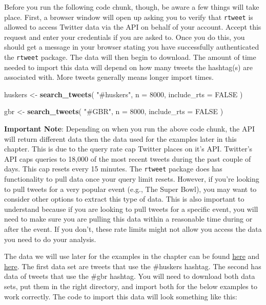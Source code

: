 \documentclass[
]{book}
\newenvironment{Shaded}{\begin{snugshade}}{\end{snugshade}}
\newcommand{\DataTypeTok}[1]{\textcolor[rgb]{0.13,0.29,0.53}{#1}}
\newcommand{\DecValTok}[1]{\textcolor[rgb]{0.00,0.00,0.81}{#1}}
\newcommand{\KeywordTok}[1]{\textcolor[rgb]{0.13,0.29,0.53}{\textbf{#1}}}
\newcommand{\NormalTok}[1]{#1}
\newcommand{\OtherTok}[1]{\textcolor[rgb]{0.56,0.35,0.01}{#1}}
\newcommand{\StringTok}[1]{\textcolor[rgb]{0.31,0.60,0.02}{#1}}
\begin{document}
Before you run the following code chunk, though, be aware a few things will take place. First, a browser window will open up asking you to verify that \texttt{rtweet} is allowed to access Twitter data via the API on behalf of your account. Accept this request and enter your credentials if you are asked to. Once you do this, you should get a message in your browser stating you have successfully authenticated the \texttt{rtweet} package. The data will then begin to download. The amount of time needed to import this data will depend on how many tweets the hashtag(s) are associated with. More tweets generally means longer import times.

\begin{Shaded}
\begin{Highlighting}[]
\NormalTok{huskers <-}\StringTok{ }\KeywordTok{search_tweets}\NormalTok{(}
  \StringTok{"#huskers"}\NormalTok{, }\DataTypeTok{n =} \DecValTok{8000}\NormalTok{, }\DataTypeTok{include_rts =} \OtherTok{FALSE}
\NormalTok{)}

\NormalTok{gbr <-}\StringTok{ }\KeywordTok{search_tweets}\NormalTok{(}
  \StringTok{"#GBR"}\NormalTok{, }\DataTypeTok{n =} \DecValTok{8000}\NormalTok{, }\DataTypeTok{include_rts =} \OtherTok{FALSE}
\NormalTok{)}
\end{Highlighting}
\end{Shaded}

\textbf{Important Note}: Depending on when you run the above code chunk, the API will return different data then the data used for the examples later in this chapter. This is due to the query rate cap Twitter places on it's API. Twitter's API caps queries to 18,000 of the most recent tweets during the past couple of days. This cap resets every 15 minutes. The \texttt{rtweet} package does has functionality to pull data once your query limit resets. However, if you're looking to pull tweets for a very popular event (e.g., The Super Bowl), you may want to consider other options to extract this type of data. This is also important to understand because if you are looking to pull tweets for a specific event, you will need to make sure you are pulling this data within a reasonable time during or after the event. If you don't, these rate limits might not allow you access the data you need to do your analysis.

The data we will use later for the examples in the chapter can be found \href{https://unl.box.com/s/x4jjifc394gxfvsvbwb3csez2ne4l4rb}{here} and \href{https://unl.box.com/s/s4ej8khwi9ah9qvqpi2jviqomfocie3n}{here}. The first data set are tweets that use the \#huskers hashtag. The second has data of tweets that use the \#gbr hashtag. You will need to download both data sets, put them in the right directory, and import both for the below examples to work correctly. The code to import this data will look something like this:
\end{document}
